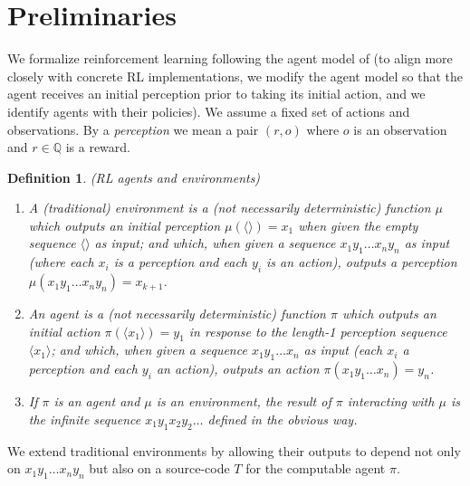 \documentclass{article}
\newtheorem{mydefinition}[mytheorem]{Definition}
\begin{document}
\section{Preliminaries}

We formalize reinforcement learning following
the agent model of \cite{hutter2004universal}
(to align more closely with concrete RL implementations, we modify
the agent model so that the agent receives an initial perception prior
to taking its initial action, and we identify agents with their policies).
We assume a fixed set of actions and observations. By a \emph{perception}
we mean a pair $(r,o)$ where $o$ is an observation and $r\in\mathbb Q$
is a reward.

\begin{mydefinition}
\label{agentenvironmentdefn}
(RL agents and environments)
  \begin{enumerate}
    \item
    A (traditional) \emph{environment} is a (not necessarily
    deterministic) function $\mu$ which outputs an initial
    perception $\mu(\langle\rangle)=x_1$ when given the empty sequence $\langle\rangle$
    as input;
    and which, when given a sequence $x_1y_1\ldots x_ny_n$
    as input (where each $x_i$ is a perception and each
    $y_i$ is an action), outputs a perception
    $\mu(x_1y_1\ldots x_ny_n)=x_{k+1}$.
    \item
    An \emph{agent} is a (not necessarily deterministic)
    function $\pi$ which outputs an initial action $\pi(\langle x_1\rangle)=y_1$
    in response to the length-1 perception sequence $\langle x_1\rangle$;
    and which, when given a sequence $x_1y_1\ldots x_n$ as input
    (each $x_i$ a perception and each $y_i$ an action),
    outputs an action $\pi(x_1y_1\ldots x_n)=y_n$.
    \item
    If $\pi$ is an agent and $\mu$ is an environment, the \emph{result of
    $\pi$ interacting with $\mu$} is the infinite sequence
    $x_1y_1x_2y_2\ldots$ defined in the obvious way.
  \end{enumerate}
\end{mydefinition}

We extend traditional environments by allowing their outputs to depend not only on
$x_1y_1\ldots x_ny_n$ but also on a source-code $T$ for the computable agent $\pi$.
\end{document}
